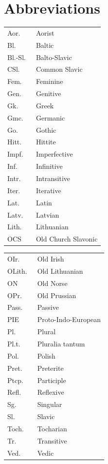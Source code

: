 \documentclass[output=paper,colorlinks,citecolor=brown]{langscibook}
\begin{document}
\section*{Abbreviations}
\begin{tabularx}{.48\textwidth}{lQ}
Aor. & Aorist\\
Bl.\ & Baltic\\
Bl.-Sl.\ & Balto-Slavic\\
CSl.\ & Common Slavic\\
Fem. & Feminine\\
Gen. & Genitive\\
Gk.\ & Greek\\
Gmc. & Germanic\\
Go. & Gothic\\
Hitt. & Hittite\\
Impf. & Imperfective\\
Inf. & Infinitive\\
Intr. & Intransitive\\
Iter. & Iterative\\
Lat.\ & Latin\\
Latv.\ & Latvian\\
Lith.\ & Lithuanian\\
OCS & Old Church Slavonic\\
\end{tabularx}
\begin{tabularx}{.48\textwidth}{lQ}
OIr.\ & Old Irish\\
OLith.\ & Old Lithuanian\\
ON & Old Norse\\
OPr.\ & Old Prussian\\
Pass. & Passive\\
PIE & Proto-Indo-European\\
Pl.\ & Plural\\
Pl.t. & Pluralia tantum\\
Pol. & Polish\\
Pret. & Preterite\\
Ptcp. & Participle\\
Refl. & Reflexive\\
Sg.\ & Singular\\
Sl.\ & Slavic\\
Toch. & Tocharian\\
Tr. & Transitive\\
Ved.\ & Vedic
\end{tabularx}



{\sloppy\printbibliography[heading=subbibliography,notkeyword=this]}
\end{document}
